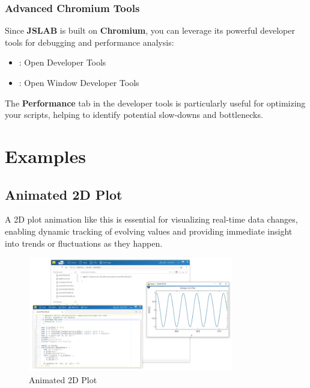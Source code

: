 \documentclass[12pt,a4paper]{article}
\begin{document}
\subsubsection{Advanced Chromium Tools}
Since \textbf{JSLAB} is built on \textbf{Chromium}, you can leverage its powerful developer tools for debugging and performance analysis:
\begin{itemize}
  \item {}: Open Developer Tools
  \item {}: Open Window Developer Tools
\end{itemize}

The \textbf{Performance} tab in the developer tools is particularly useful for optimizing your scripts, helping to identify potential slow-downs and bottlenecks.

\section{Examples}

\subsection{Animated 2D Plot}
\label{sec:animated-2d-plot}

A 2D plot animation like this is essential for visualizing real-time data changes, enabling dynamic tracking of evolving values and providing immediate insight into trends or fluctuations as they happen.

\begin{figure}[H]
    \centering
    \includegraphics[width=0.8\textwidth]{resources/JSLAB_2D_plot.png}
    \caption{Animated 2D Plot}
    \label{fig:animated-2d-plot}
\end{figure}
\end{document}

